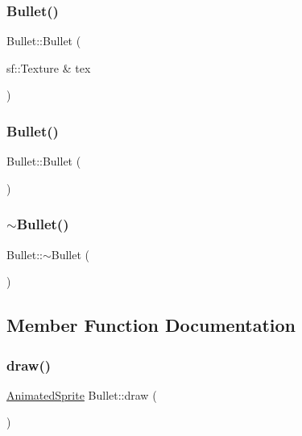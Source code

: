 \subsubsection{\texorpdfstring{Bullet()}{Bullet()}\hspace{0.1cm}{\footnotesize\ttfamily [1/2]}}
{\footnotesize\ttfamily Bullet\+::\+Bullet (\begin{DoxyParamCaption}\item[{sf\+::\+Texture \&}]{tex }\end{DoxyParamCaption})}

\mbox{\label{class_bullet_acd7befc0bc18907cc1d871d37bbdddeb}} 
\subsubsection{\texorpdfstring{Bullet()}{Bullet()}\hspace{0.1cm}{\footnotesize\ttfamily [2/2]}}
{\footnotesize\ttfamily Bullet\+::\+Bullet (\begin{DoxyParamCaption}{ }\end{DoxyParamCaption})}

\mbox{\label{class_bullet_aaeb5cb41d7db89f49007b08b41f1bfcf}} 
\subsubsection{\texorpdfstring{$\sim$\+Bullet()}{~Bullet()}}
{\footnotesize\ttfamily Bullet\+::$\sim$\+Bullet (\begin{DoxyParamCaption}{ }\end{DoxyParamCaption})}



\subsection{Member Function Documentation}
\mbox{\label{class_bullet_abd80643d0485e32232ad46cc2087de40}} 
\subsubsection{\texorpdfstring{draw()}{draw()}}
{\footnotesize\ttfamily \hyperlink{class_animated_sprite}{Animated\+Sprite} Bullet\+::draw (\begin{DoxyParamCaption}{ }\end{DoxyParamCaption})}

